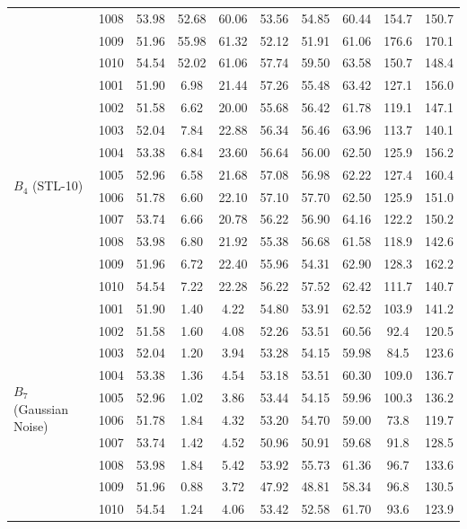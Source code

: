 \documentclass[10pt]{article}
\begin{document}
\begin{table}[!ht]
{\begin{tabular}{l c cc c c cc cc}
 & 1008 & 53.98 & 52.68 & 60.06 & 53.56 & 54.85 & 60.44 & 154.7 & 150.7 \\
 & 1009 & 51.96 & 55.98 & 61.32 & 52.12 & 51.91 & 61.06 & 176.6 & 170.1 \\
 & 1010 & 54.54 & 52.02 & 61.06 & 57.74 & 59.50 & 63.58 & 150.7 & 148.4 \\
\midrule
\multirow{10}{*}{$B_4$ (STL-10)}
 & 1001 & 51.90 & 6.98  & 21.44 & 57.26 & 55.48 & 63.42 & 127.1 & 156.0 \\
 & 1002 & 51.58 & 6.62  & 20.00 & 55.68 & 56.42 & 61.78 & 119.1 & 147.1 \\
 & 1003 & 52.04 & 7.84  & 22.88 & 56.34 & 56.46 & 63.96 & 113.7 & 140.1 \\
 & 1004 & 53.38 & 6.84  & 23.60 & 56.64 & 56.00 & 62.50 & 125.9 & 156.2 \\
 & 1005 & 52.96 & 6.58  & 21.68 & 57.08 & 56.98 & 62.22 & 127.4 & 160.4 \\
 & 1006 & 51.78 & 6.60  & 22.10 & 57.10 & 57.70 & 62.50 & 125.9 & 151.0 \\
 & 1007 & 53.74 & 6.66  & 20.78 & 56.22 & 56.90 & 64.16 & 122.2 & 150.2 \\
 & 1008 & 53.98 & 6.80  & 21.92 & 55.38 & 56.68 & 61.58 & 118.9 & 142.6 \\
 & 1009 & 51.96 & 6.72  & 22.40 & 55.96 & 54.31 & 62.90 & 128.3 & 162.2 \\
 & 1010 & 54.54 & 7.22  & 22.28 & 56.22 & 57.52 & 62.42 & 111.7 & 140.7 \\
\midrule
\multirow{10}{*}{$B_7$ (Gaussian Noise)}
 & 1001 & 51.90 & 1.40  & 4.22  & 54.80 & 53.91 & 62.52 & 103.9 & 141.2 \\
 & 1002 & 51.58 & 1.60  & 4.08  & 52.26 & 53.51 & 60.56 & 92.4  & 120.5 \\
 & 1003 & 52.04 & 1.20  & 3.94  & 53.28 & 54.15 & 59.98 & 84.5  & 123.6 \\
 & 1004 & 53.38 & 1.36  & 4.54  & 53.18 & 53.51 & 60.30 & 109.0 & 136.7 \\
 & 1005 & 52.96 & 1.02  & 3.86  & 53.44 & 54.15 & 59.96 & 100.3 & 136.2 \\
 & 1006 & 51.78 & 1.84  & 4.32  & 53.20 & 54.70 & 59.00 & 73.8  & 119.7 \\
 & 1007 & 53.74 & 1.42  & 4.52  & 50.96 & 50.91 & 59.68 & 91.8  & 128.5 \\
 & 1008 & 53.98 & 1.84  & 5.42  & 53.92 & 55.73 & 61.36 & 96.7  & 133.6 \\
 & 1009 & 51.96 & 0.88  & 3.72  & 47.92 & 48.81 & 58.34 & 96.8  & 130.5 \\
 & 1010 & 54.54 & 1.24  & 4.06  & 53.42 & 52.58 & 61.70 & 93.6  & 123.9 \\
\bottomrule
\end{tabular}%
}
\end{table}
\end{document}
